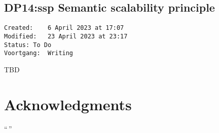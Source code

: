 \documentclass[sort&compress,preprint,3p,authoryear,twocolumn]{elsarticle}
\theoremstyle{break}			%
\begin{document}
\subsection{DP14:ssp Semantic scalability
principle}\label{dp14ssp-semantic-scalability-principle}

\begin{verbatim}
Created:    6 April 2023 at 17:07
Modified:   23 April 2023 at 23:17
Status: To Do
Voortgang:  Writing
\end{verbatim}

TBD


\section*{Acknowledgments}
``\,''



\end{document}
